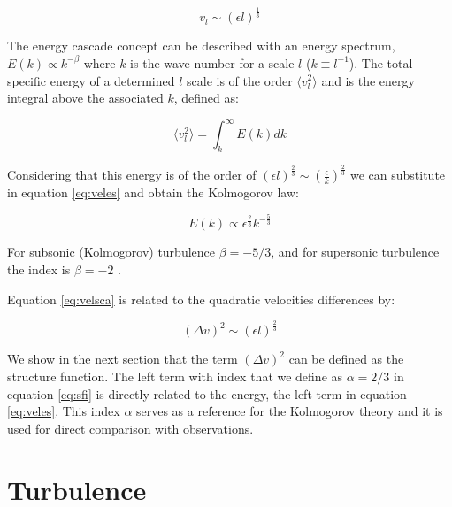 \begin{equation}\label{eq:velsca}
v_{l} \sim (\epsilon l)^{\frac{1}{3}}
\end{equation}

The energy cascade concept can  be described with an energy spectrum, $E(k) \propto k^{-\beta}$ where $k$ is the wave number for a scale $l$ ($k \equiv l^{-1}$). The total specific energy of a determined $l$ scale is of the order $\langle v_{l}^{2} \rangle$ and is the energy integral above the associated $k$, defined as:

\begin{equation}\label{eq:veles}
 \langle v_{l}^{2} \rangle = \int_{k}^{\infty} E(k)dk
\end{equation}

Considering that this energy is of the order of $(\epsilon l)^{\frac{2}{3}} \sim (\frac{\epsilon}{k})^{\frac{2}{3}}$ we can substitute in equation \ref{eq:veles} and obtain the Kolmogorov law:

\begin{equation}\label{eq:kolm}
E(k) \propto \epsilon^\frac{2}{3} k^{-\frac{5}{3}}
\end{equation}

For subsonic (Kolmogorov) turbulence $\beta= -5/3$, and for supersonic turbulence the index is $\beta=-2$ \citep{burg}. 

Equation \ref{eq:velsca} is related to the quadratic velocities differences by:

\begin{equation}\label{eq:sfi}
(\Delta v)^{2} \sim (\epsilon l)^{\frac{2}{3}}
\end{equation}

We show in the next section that the term $(\Delta v)^{2}$ can be defined as the structure function. The left term with index that we define as $\alpha= 2/3$ in equation \ref{eq:sfi} is directly related to the energy, the left term in equation \ref{eq:veles}. This index $\alpha$ serves as a reference for the Kolmogorov theory and it is used for direct comparison with observations.
\section{Turbulence}\label{sec:turb}

